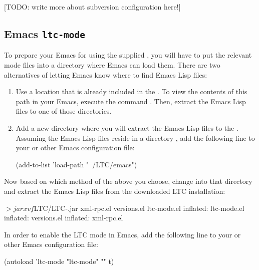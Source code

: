 [TODO: write more about subversion configuration here!]



\subsection{Emacs \texttt{ltc-mode}} \label{sec:config-emacs}

To prepare your Emacs for using the supplied , you will have to put the relevant mode files into a directory where Emacs can load them. There are two alternatives of letting Emacs know where to find Emacs Lisp files:
\begin{enumerate}
\item Use a location that is already included in the . To view the contents of this path in your Emacs, execute the command . Then, extract the Emacs Lisp files to one of those directories.
\item Add a new directory where you will extract the Emacs Lisp files to the . Assuming the Emacs Lisp files reside in a directory , add the following line to your  or other Emacs configuration file:
  \begin{CodeVerbatim}
(add-to-list 'load-path "~/LTC/emacs")
  \end{CodeVerbatim}
\end{enumerate}

Now based on which method of the above you choose, change into that directory and extract the Emacs Lisp files from the downloaded LTC installation:
\begin{CodeVerbatim}[commandchars=\\\{\}]
$> jar xvf $LTC/LTC-\version.jar xml-rpc.el versions.el ltc-mode.el
 inflated: ltc-mode.el
 inflated: versions.el
 inflated: xml-rpc.el
\end{CodeVerbatim}

In order to enable the LTC mode in Emacs, add the following line to your  or other Emacs configuration file:

\begin{CodeVerbatim}
(autoload 'ltc-mode "ltc-mode" "" t)
\end{CodeVerbatim}

